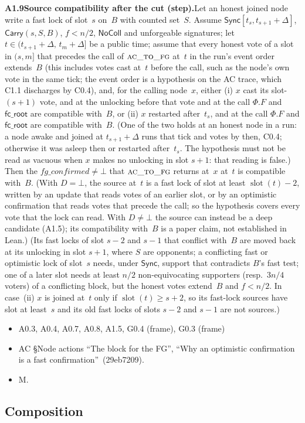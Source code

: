 \documentclass{article}
\newcommand{\slot}{\operatorname{slot}}
\newcommand{\Fr}{\Phi}
\newcommand{\fcroot}{\mathsf{fc\_root}}
\newcommand{\fname}[1]{\text{\textsc{#1}}}
\newcommand{\dagnode}[6]{%
\par\medskip\noindent\textbf{#1\enspace #2.}\enspace #3
\begin{itemize}[leftmargin=2.2em,itemsep=0pt,topsep=2pt]
\item[\emph{Uses}] #4
\item[\emph{Evid.}] #5
\item[\emph{Task}] #6
\end{itemize}}
\begin{document}
\dagnode{A1.9}{Source compatibility after the cut (step)}{Let an honest joined
node write a fast lock of slot~$s$ on~$B$ with counted set~$S$.  Assume
$\mathsf{Sync}[t_s,t_{s+1}+\Delta]$, $\mathsf{Carry}(s,S,B)$, $f<n/2$,
$\mathsf{NoColl}$ and unforgeable signatures; let $t\in(t_{s+1}+\Delta,\,
t_m+\Delta]$ be a public time; assume that every honest vote of a slot in
$(s,m]$ that precedes the call of $\fname{ac\_to\_fg}$ at~$t$ in the run's
event order extends~$B$ (this includes votes cast at~$t$ before the call, such
as the node's own vote in the same tick; the event order is a hypothesis on the
AC trace, which C1.1 discharges by C0.4), and, for the calling node~$x$,
either (i) $x$ cast its slot-$(s+1)$ vote, and at the unlocking before that vote
and at the call $\Fr.F$ and $\fcroot$ are compatible with~$B$, or (ii) $x$
restarted after~$t_s$, and at the call $\Fr.F$ and $\fcroot$ are compatible
with~$B$.  (One of the two holds at an honest node in a run: a node awake and
joined at $t_{s+1}+\Delta$ runs that tick and votes by then, C0.4; otherwise it
was asleep then or restarted after~$t_s$.  The hypothesis must not be read as
vacuous when $x$ makes no unlocking in slot $s+1$: that reading is false.)  Then the $\mathit{fg\_confirmed}\neq\bot$ that
$\fname{ac\_to\_fg}$ returns at~$x$ at~$t$ is compatible with~$B$.
(With $D=\bot$, the source at~$t$ is a fast lock of slot at least $\slot(t)-2$, written by an
update that reads votes of an earlier slot, or by an optimistic confirmation
that reads votes that precede the call; so the hypothesis covers every vote
that the lock can read.  With $D\neq\bot$ the source can instead be a deep
candidate (A1.5); its compatibility with~$B$ is a paper claim, not established
in Lean.)  (Its fast
locks of slot $s-2$ and $s-1$ that conflict with~$B$ are moved back at its
unlocking in slot $s+1$, where $S$ are opponents; a conflicting fast or
optimistic lock of slot~$s$ needs, under $\mathsf{Sync}$, support that
contradicts $B$'s fast test; one of a later slot needs at least $n/2$
non-equivocating supporters (resp.\ $3n/4$ voters) of a conflicting block,
but the honest votes extend~$B$ and $f<n/2$.  In case~(ii) $x$ is joined at~$t$
only if $\slot(t)\geq s+2$, so its fast-lock sources have slot at least~$s$ and its old
fast locks of slots $s-2$ and $s-1$ are not sources.)}
{A0.3, A0.4, A0.7, A0.8, A1.5, G0.4 (frame), G0.3 (frame)}{AC \S Node actions ``The block for the FG'', ``Why
an optimistic confirmation is a fast confirmation''~(29eb7209).}{M.}

\subsection{Composition}
\end{document}

